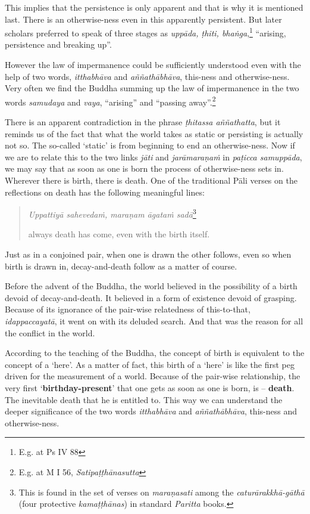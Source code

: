This implies that the persistence is only apparent and that is why it is mentioned last. There is an otherwise-ness even in this apparently persistent. But later scholars preferred to speak of three stages as \emph{uppāda, ṭhiti, bhaṅga},\footnote{E.g. at Ps IV 88} ``arising, persistence and breaking up''.

However the law of impermanence could be sufficiently understood even with the help of two words, \emph{itthabhāva} and \emph{aññathābhāva}, this-ness and otherwise-ness. Very often we find the Buddha summing up the law of impermanence in the two words \emph{samudaya} and \emph{vaya}, ``arising'' and ``passing away''.\footnote{E.g. at M I 56, \emph{Satipaṭṭhānasutta}}

There is an apparent contradiction in the phrase \emph{ṭhitassa aññathatta}, but it reminds us of the fact that what the world takes as static or persisting is actually not so. The so-called `static' is from beginning to end an otherwise-ness. Now if we are to relate this to the two links \emph{jāti} and \emph{jarāmaraṇaṁ} in \emph{paṭicca samuppāda}, we may say that as soon as one is born the process of otherwise-ness sets in. Wherever there is birth, there is death. One of the traditional Pāli verses on the reflections on death has the following meaningful lines:

\begin{quote}
\emph{Uppattiyā sahevedaṁ, maraṇam āgataṁ sadā}\footnote{This is found in the set of verses on \emph{maraṇasati} among the \emph{caturārakkhā-gāthā} (four protective \emph{kamaṭṭhānas}) in standard \emph{Paritta} books.}

always death has come, even with the birth itself.
\end{quote}

Just as in a conjoined pair, when one is drawn the other follows, even so when birth is drawn in, decay-and-death follow as a matter of course.

Before the advent of the Buddha, the world believed in the possibility of a birth devoid of decay-and-death. It believed in a form of existence devoid of grasping. Because of its ignorance of the pair-wise relatedness of this-to-that, \emph{idappaccayatā}, it went on with its deluded search. And that was the reason for all the conflict in the world.

According to the teaching of the Buddha, the concept of birth is equivalent to the concept of a `here'. As a matter of fact, this birth of a `here' is like the first peg driven for the measurement of a world. Because of the pair-wise relationship, the very first `\textbf{birthday-present}' that one gets as soon as one is born, is -- \textbf{death}. The inevitable death that he is entitled to. This way we can understand the deeper significance of the two words \emph{itthabhāva} and \emph{aññathābhāva}, this-ness and otherwise-ness.

